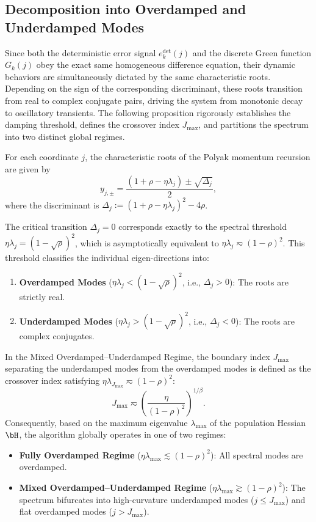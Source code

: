 \subsection{Decomposition into Overdamped and Underdamped Modes}
\label{app:pol_decomp_modes}

Since both the deterministic error signal $e_k^{\mathrm{det}}(j)$ and the discrete Green function $G_k(j)$ obey the exact same homogeneous difference equation, their dynamic behaviors are simultaneously dictated by the same characteristic roots. Depending on the sign of the corresponding discriminant, these roots transition from real to complex conjugate pairs, driving the system from monotonic decay to oscillatory transients. The following proposition rigorously establishes the damping threshold, defines the crossover index $J_{\max}$, and partitions the spectrum into two distinct global regimes.

\begin{proposition}
\label{prop:pol_mode_decomposition}
For each coordinate $j$, the characteristic roots of the Polyak momentum recursion are given by
\[
    y_{j, \pm} = \frac{(1+\rho-\eta\lambda_j) \pm \sqrt{\Delta_j}}{2},
\]
where the discriminant is $\Delta_j := (1+\rho-\eta\lambda_j)^2 - 4\rho$. 

The critical transition $\Delta_j = 0$ corresponds exactly to the spectral threshold $\eta\lambda_j = (1-\sqrt{\rho})^2$, which is asymptotically equivalent to $\eta\lambda_j \eqsim (1-\rho)^2$. This threshold classifies the individual eigen-directions into:
\begin{enumerate}
    \item \textbf{Overdamped Modes} ($\eta\lambda_j < (1-\sqrt{\rho})^2$, i.e., $\Delta_j > 0$): The roots are strictly real.
    \item \textbf{Underdamped Modes} ($\eta\lambda_j > (1-\sqrt{\rho})^2$, i.e., $\Delta_j < 0$): The roots are complex conjugates.
\end{enumerate}
In the Mixed Overdamped--Underdamped Regime, the boundary index $J_{\max}$ separating the underdamped modes from the overdamped modes is defined as the crossover index satisfying $\eta\lambda_{J_{\max}} \eqsim (1-\rho)^2$:
\begin{equation}
\label{eq:J_max}
    J_{\max} \eqsim \left(\frac{\eta}{(1-\rho)^2}\right)^{1/\beta}.
\end{equation}
Consequently, based on the maximum eigenvalue $\lambda_{\max}$ of the population Hessian $\bH$, the algorithm globally operates in one of two regimes:
\begin{itemize}
    \item \textbf{Fully Overdamped Regime} ($\eta\lambda_{\max} \lesssim (1-\rho)^2$): All spectral modes are overdamped.
    \item \textbf{Mixed Overdamped--Underdamped Regime} ($\eta\lambda_{\max} \gtrsim (1-\rho)^2$): The spectrum bifurcates into high-curvature underdamped modes ($j \le J_{\max}$) and flat overdamped modes ($j > J_{\max}$).
\end{itemize}
\end{proposition}

